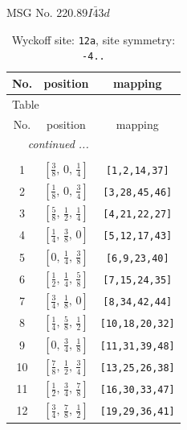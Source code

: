 \documentclass[fleqn,8pt]{jsarticle}
\begin{document}
\setcounter{MaxMatrixCols}{32}

\renewcommand{\tablename}{Table~}
\renewcommand{\figurename}{Figure~}
\begin{center}
\LARGE
MSG No. 220.89\quad$I\bar{4}3d$
\end{center}
\renewcommand{\arraystretch}{1.2}
\begin{longtable}{ccc}
\caption{Wyckoff site: {\tt 12a}, site symmetry: {\tt -4..}}
 \\
 \hline \hline
No. & position & mapping \\ \hline \endfirsthead

\multicolumn{2}{l}{\tablename\ \thetable{}} \\
 \hline \hline
No. & position & mapping \\ \hline \endhead

 \hline \hline
\multicolumn{2}{r}{\footnotesize\it continued ...} \\ \endfoot

 \hline \hline
\multicolumn{2}{r}{} \\ \endlastfoot

1 & $\left[ \frac{3}{8},\, 0,\, \frac{1}{4} \right]$ & {\tt [1,2,14,37]} \\ \hline
2 & $\left[ \frac{1}{8},\, 0,\, \frac{3}{4} \right]$ & {\tt [3,28,45,46]} \\ \hline
3 & $\left[ \frac{5}{8},\, \frac{1}{2},\, \frac{1}{4} \right]$ & {\tt [4,21,22,27]} \\ \hline
4 & $\left[ \frac{1}{4},\, \frac{3}{8},\, 0 \right]$ & {\tt [5,12,17,43]} \\ \hline
5 & $\left[ 0,\, \frac{1}{4},\, \frac{3}{8} \right]$ & {\tt [6,9,23,40]} \\ \hline
6 & $\left[ \frac{1}{2},\, \frac{1}{4},\, \frac{5}{8} \right]$ & {\tt [7,15,24,35]} \\ \hline
7 & $\left[ \frac{3}{4},\, \frac{1}{8},\, 0 \right]$ & {\tt [8,34,42,44]} \\ \hline
8 & $\left[ \frac{1}{4},\, \frac{5}{8},\, \frac{1}{2} \right]$ & {\tt [10,18,20,32]} \\ \hline
9 & $\left[ 0,\, \frac{3}{4},\, \frac{1}{8} \right]$ & {\tt [11,31,39,48]} \\ \hline
10 & $\left[ \frac{7}{8},\, \frac{1}{2},\, \frac{3}{4} \right]$ & {\tt [13,25,26,38]} \\ \hline
11 & $\left[ \frac{1}{2},\, \frac{3}{4},\, \frac{7}{8} \right]$ & {\tt [16,30,33,47]} \\ \hline
12 & $\left[ \frac{3}{4},\, \frac{7}{8},\, \frac{1}{2} \right]$ & {\tt [19,29,36,41]} \\
\end{longtable}
\end{document}
